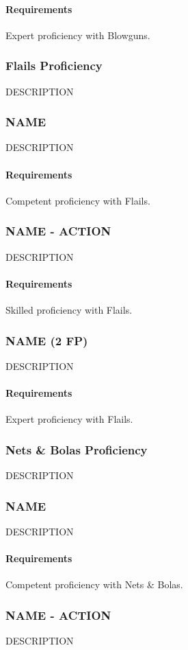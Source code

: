     \paragraph{Requirements} Expert proficiency with Blowguns.
\subsubsection{Flails Proficiency} \label{feat::name}
    DESCRIPTION
\subsubsection{NAME} \label{feat::name}
    DESCRIPTION
    \paragraph{Requirements} Competent proficiency with Flails.
\subsubsection{NAME - ACTION} \label{feat::name}
    DESCRIPTION
    \paragraph{Requirements} Skilled proficiency with Flails.
\subsubsection{NAME (2 FP)} \label{feat::name}
    DESCRIPTION
    \paragraph{Requirements} Expert proficiency with Flails.
\subsubsection{Nets \& Bolas Proficiency} \label{feat::name}
    DESCRIPTION
\subsubsection{NAME} \label{feat::name}
    DESCRIPTION
    \paragraph{Requirements} Competent proficiency with Nets \& Bolas.
\subsubsection{NAME - ACTION} \label{feat::name}
    DESCRIPTION
